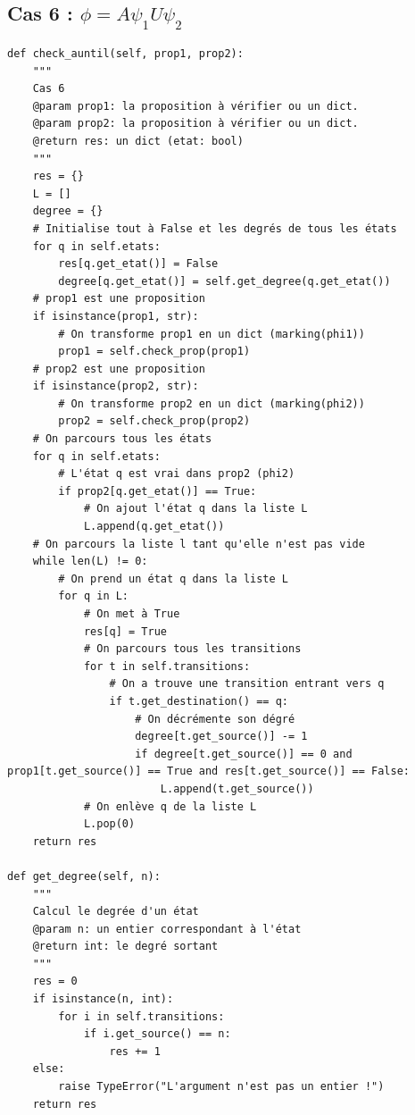 \documentclass[12pt,a4paper]{report}
\begin{document}
\subsection*{Cas 6 : $\phi = A \psi_{1} U \psi_{2}$}

\begin{verbatim}
def check_auntil(self, prop1, prop2):
    """
    Cas 6
    @param prop1: la proposition à vérifier ou un dict.
    @param prop2: la proposition à vérifier ou un dict.
    @return res: un dict (etat: bool)
    """
    res = {}
    L = []
    degree = {}
    # Initialise tout à False et les degrés de tous les états
    for q in self.etats:
        res[q.get_etat()] = False
        degree[q.get_etat()] = self.get_degree(q.get_etat())
    # prop1 est une proposition
    if isinstance(prop1, str):
        # On transforme prop1 en un dict (marking(phi1))
        prop1 = self.check_prop(prop1)
    # prop2 est une proposition
    if isinstance(prop2, str):
        # On transforme prop2 en un dict (marking(phi2))
        prop2 = self.check_prop(prop2)
    # On parcours tous les états
    for q in self.etats:
        # L'état q est vrai dans prop2 (phi2)
        if prop2[q.get_etat()] == True:
            # On ajout l'état q dans la liste L
            L.append(q.get_etat())
    # On parcours la liste l tant qu'elle n'est pas vide
    while len(L) != 0:
        # On prend un état q dans la liste L
        for q in L:
            # On met à True
            res[q] = True
            # On parcours tous les transitions
            for t in self.transitions:
                # On a trouve une transition entrant vers q
                if t.get_destination() == q:
                    # On décrémente son dégré
                    degree[t.get_source()] -= 1
                    if degree[t.get_source()] == 0 and prop1[t.get_source()] == True and res[t.get_source()] == False:
                        L.append(t.get_source())
            # On enlève q de la liste L
            L.pop(0)
    return res
    
def get_degree(self, n):
    """
    Calcul le degrée d'un état
    @param n: un entier correspondant à l'état
    @return int: le degré sortant
    """
    res = 0
    if isinstance(n, int):
        for i in self.transitions:
            if i.get_source() == n:
                res += 1
    else:
        raise TypeError("L'argument n'est pas un entier !")
    return res
\end{verbatim}
\end{document}
